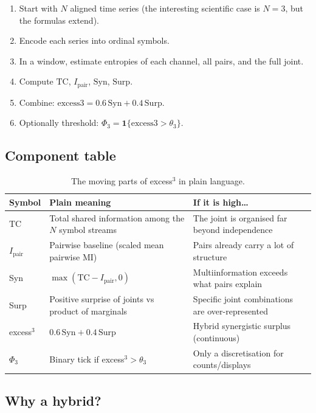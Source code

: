 \documentclass[11pt,a4paper]{article}
\begin{document}
\begin{enumerate}[leftmargin=*,itemsep=3pt]
  \item Start with $N$ aligned time series (the interesting scientific case
  is $N=3$, but the formulas extend).
  \item Encode each series into ordinal symbols.
  \item In a window, estimate entropies of each channel, all pairs, and the
  full joint.
  \item Compute $\mathrm{TC}$, $I_{\mathrm{pair}}$, $\mathrm{Syn}$,
  $\mathrm{Surp}$.
  \item Combine: $\mathrm{excess3}=0.6\,\mathrm{Syn}+0.4\,\mathrm{Surp}$.
  \item Optionally threshold: $\Phi_3=\mathbf{1}\{\mathrm{excess3}>\theta_3\}$.
\end{enumerate}

\subsection{Component table}

\begin{table}[H]
\centering
\caption{The moving parts of excess$^3$ in plain language.}
\label{tab:parts}
\small
\begin{tabularx}{\textwidth}{@{}>{\raggedright\arraybackslash}p{2.6cm} X X@{}}
\toprule
\textbf{Symbol} & \textbf{Plain meaning} & \textbf{If it is high\ldots} \\
\midrule
TC
  & Total shared information among the $N$ symbol streams
  & The joint is organised far beyond independence \\
$I_{\mathrm{pair}}$
  & Pairwise baseline (scaled mean pairwise MI)
  & Pairs already carry a lot of structure \\
Syn
  & $\max(\mathrm{TC}-I_{\mathrm{pair}},0)$
  & Multiinformation exceeds what pairs explain \\
Surp
  & Positive surprise of joints vs product of marginals
  & Specific joint combinations are over-represented \\
excess$^3$
  & $0.6\,\mathrm{Syn}+0.4\,\mathrm{Surp}$
  & Hybrid synergistic surplus (continuous) \\
$\Phi_3$
  & Binary tick if excess$^3>\theta_3$
  & Only a discretisation for counts/displays \\
\bottomrule
\end{tabularx}
\end{table}

\subsection{Why a hybrid?}
\end{document}
